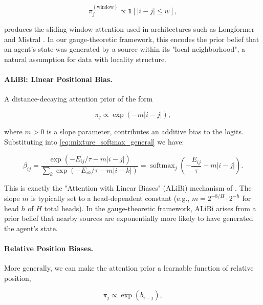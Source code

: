 \documentclass[twoside,11pt]{article}
\begin{document}
\begin{equation}
\pi_j^{(\text{window})} \propto \mathbf{1}[|i - j| \leq w],
\label{eq:window_prior}
\end{equation}

produces the sliding window attention used in architectures such as Longformer \citep{beltagy2020longformer} and Mistral \citep{jiang2023mistral}. In our gauge-theoretic framework, this encodes the prior belief that an agent's state was generated by a source within its "local neighborhood", a natural assumption for data with locality structure.

\paragraph{ALiBi: Linear Positional Bias.}

A distance-decaying attention prior of the form

\begin{equation}
\pi_j \propto \exp(-m|i - j|),
\label{eq:alibi_prior}
\end{equation}

where $m > 0$ is a slope parameter, contributes an additive bias to the logits. Substituting into \eqref{eq:mixture_softmax_general} we have:

\begin{equation}
\beta_{ij} = \frac{\exp(-E_{ij}/\tau - m|i-j|)}{\sum_k \exp(-E_{ik}/\tau - m|i-k|)} = \operatorname{softmax}_j\!\left(-\frac{E_{ij}}{\tau} - m|i - j|\right).
\label{eq:alibi_attention}
\end{equation}

This is exactly the "Attention with Linear Biases" (ALiBi) mechanism of \citet{press2022train}. The slope $m$ is typically set to a head-dependent constant (e.g., $m = 2^{-8/H} \cdot 2^{-h}$ for head $h$ of $H$ total heads). In the gauge-theoretic framework, ALiBi arises from a prior belief that nearby sources are exponentially more likely to have generated the agent's state.

\paragraph{Relative Position Biases.}
More generally, we can make the attention prior a learnable function of relative position,

\begin{equation}
\pi_j \propto \exp(b_{i-j}),
\label{eq:relative_bias_prior}
\end{equation}
\end{document}

